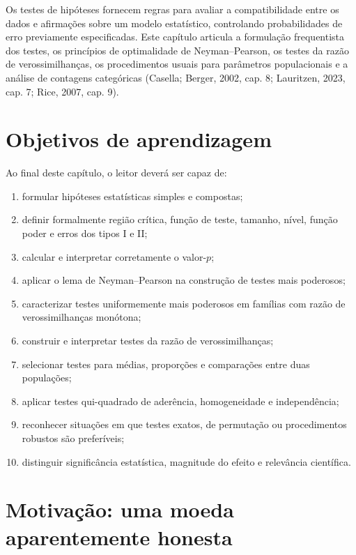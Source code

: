 \documentclass[
  letterpaper,
  DIV=11,
  numbers=noendperiod]{scrreprt}
\providecommand{\tightlist}{%
  \setlength{\itemsep}{0pt}\setlength{\parskip}{0pt}}\usepackage{longtable,booktabs,array}
\begin{document}
Os testes de hipóteses fornecem regras para avaliar a compatibilidade
entre os dados e afirmações sobre um modelo estatístico, controlando
probabilidades de erro previamente especificadas. Este capítulo articula
a formulação frequentista dos testes, os princípios de optimalidade de
Neyman--Pearson, os testes da razão de verossimilhanças, os
procedimentos usuais para parâmetros populacionais e a análise de
contagens categóricas (Casella; Berger, 2002, cap. 8; Lauritzen, 2023,
cap. 7; Rice, 2007, cap. 9).

\section{Objetivos de aprendizagem}\label{objetivos-de-aprendizagem}

Ao final deste capítulo, o leitor deverá ser capaz de:

\begin{enumerate}
\def\labelenumi{\arabic{enumi}.}
\tightlist
\item
  formular hipóteses estatísticas simples e compostas;
\item
  definir formalmente região crítica, função de teste, tamanho, nível,
  função poder e erros dos tipos I e II;
\item
  calcular e interpretar corretamente o valor-\(p\);
\item
  aplicar o lema de Neyman--Pearson na construção de testes mais
  poderosos;
\item
  caracterizar testes uniformemente mais poderosos em famílias com razão
  de verossimilhanças monótona;
\item
  construir e interpretar testes da razão de verossimilhanças;
\item
  selecionar testes para médias, proporções e comparações entre duas
  populações;
\item
  aplicar testes qui-quadrado de aderência, homogeneidade e
  independência;
\item
  reconhecer situações em que testes exatos, de permutação ou
  procedimentos robustos são preferíveis;
\item
  distinguir significância estatística, magnitude do efeito e relevância
  científica.
\end{enumerate}

\section{Motivação: uma moeda aparentemente
honesta}\label{motivauxe7uxe3o-uma-moeda-aparentemente-honesta}
\end{document}
